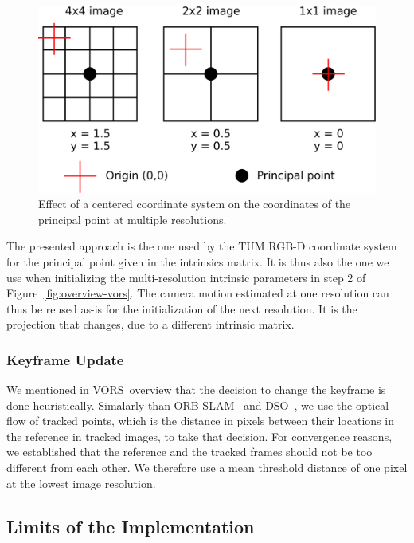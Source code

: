 \begin{figure}[ht]
	\centering
	\includegraphics[width=\linewidth]{assets/img/multiscale-intrinsics.pdf}
	\caption{Effect of a centered coordinate system on
	the coordinates of the principal point at multiple resolutions.}%
	\label{fig:multiscale-intrinsics}
\end{figure}

The presented approach is the one used by the TUM RGB-D coordinate system
for the principal point given in the intrinsics matrix.
It is thus also the one we use when initializing the multi-resolution intrinsic
parameters in step 2 of Figure~\ref{fig:overview-vors}.
The camera motion estimated at one resolution can thus be reused as-is
for the initialization of the next resolution.
It is the projection that changes, due to a different intrinsic matrix.

\subsubsection{Keyframe Update}%
\label{ssub:keyframe-update}

We mentioned in VORS overview that the decision to change the keyframe is done heuristically.
Simalarly than ORB-SLAM~\cite{mur2015orb} and DSO~\cite{engel2017direct},
we use the optical flow of tracked points, which is
the distance in pixels between their locations in the reference in tracked images,
to take that decision.
For convergence reasons, we established that the reference and the tracked frames
should not be too different from each other.
We therefore use a mean threshold distance of one pixel at the lowest image resolution.


\subsection{Limits of the Implementation}%
\label{sub:limits-implementation}

